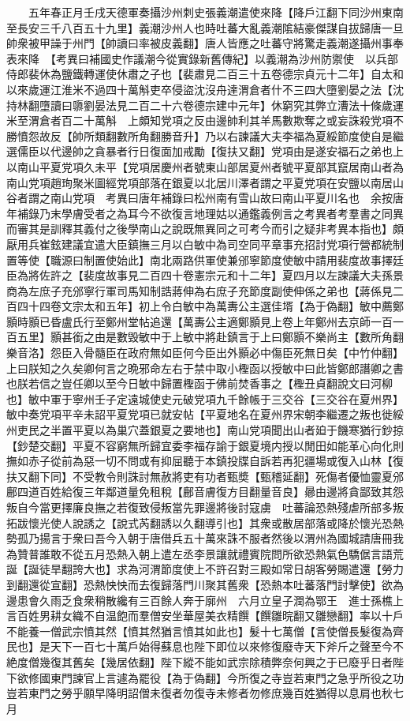　　五年春正月壬戌天德軍奏攝沙州刺史張義潮遣使來降【降戶江翻下同沙州東南至長安三千八百五十九里】義潮沙州人也時吐蕃大亂義潮隂結豪傑謀自拔歸唐一旦帥衆被甲譟于州門【帥讀曰率被皮義翻】唐人皆應之吐蕃守將驚走義潮遂攝州事奉表來降　【考異曰補國史作議潮今從實錄新舊傳紀】以義潮為沙州防禦使　以兵部侍郎裴休為鹽鐵轉運使休肅之子也【裴肅見二百三十五卷德宗貞元十二年】自太和以來歲運江淮米不過四十萬斛吏卒侵盜沈沒舟達渭倉者什不三四大墮劉晏之法【沈持林翻墮讀曰隳劉晏法見二百二十六卷德宗建中元年】休窮究其弊立漕法十條歲運米至渭倉者百二十萬斛　上頗知党項之反由邊帥利其羊馬數欺奪之或妄誅殺党項不勝憤怨故反【帥所類翻數所角翻勝音升】乃以右諫議大夫李福為夏綏節度使自是繼選儒臣以代邊帥之貪暴者行日復面加戒勵【復扶又翻】党項由是遂安福石之弟也上以南山平夏党項久未平【党項居慶州者號東山部居夏州者號平夏部其竄居南山者為南山党項趙珣聚米圖經党項部落在銀夏以北居川澤者謂之平夏党項在安鹽以南居山谷者謂之南山党項　考異曰唐年補錄曰松州南有雪山故曰南山平夏川名也　余按唐年補錄乃末學膚受者之為耳今不欲復言地理姑以通鑑義例言之考異者考羣書之同異而審其是訓釋其義付之後學南山之說既無異同之可考今而引之疑非考異本指也】頗厭用兵崔鉉建議宜遣大臣鎮撫三月以白敏中為司空同平章事充招討党項行營都統制置等使【職源曰制置使始此】南北兩路供軍使兼邠寧節度使敏中請用裴度故事擇廷臣為將佐許之【裴度故事見二百四十卷憲宗元和十二年】夏四月以左諫議大夫孫景商為左庶子充邠寧行軍司馬知制誥蔣伸為右庶子充節度副使伸係之弟也【蔣係見二百四十四卷文宗太和五年】初上令白敏中為萬夀公主選佳壻【為于偽翻】敏中薦鄭顥時顥已昏盧氏行至鄭州堂帖追還【萬夀公主適鄭顥見上卷上年鄭州去京師一百一百五里】顥甚銜之由是數毁敏中于上敏中將赴鎮言于上曰鄭顥不樂尚主【數所角翻樂音洛】怨臣入骨髓臣在政府無如臣何今臣出外顥必中傷臣死無日矣【中竹仲翻】上曰朕知之久矣卿何言之晩邪命左右于禁中取小檉函以授敏中曰此皆鄭郎譖卿之書也朕若信之豈任卿以至今日敏中歸置檉函于佛前焚香事之【檉丑貞翻說文曰河柳也】敏中軍于寧州壬子定遠城使史元破党項九千餘帳于三交谷【三交谷在夏州界】敏中奏党項平辛未詔平夏党項已就安帖【平夏地名在夏州界宋朝李繼遷之叛也徙綏州吏民之半置平夏以為巢穴蓋銀夏之要地也】南山党項聞出山者廹于饑寒猶行鈔掠【鈔楚交翻】平夏不容窮無所歸宜委李福存諭于銀夏境内授以閒田如能革心向化則撫如赤子從前為惡一切不問或有抑屈聽于本鎮投牒自訴若再犯疆場或復入山林【復扶又翻下同】不受教令則誅討無赦將吏有功者甄奬【甄稽延翻】死傷者優恤靈夏邠鄜四道百姓給復三年鄰道量免租稅【鄜音膚復方目翻量音良】曏由邊將貪鄙致其怨叛自今當更擇廉良撫之若復致侵叛當先罪邊將後討寇虜　吐蕃論恐熱殘虐所部多叛拓跋懷光使人說誘之【說式芮翻誘以久翻導引也】其衆或散居部落或降於懷光恐熱勢孤乃揚言于衆曰吾今入朝于唐借兵五十萬來誅不服者然後以渭州為國城請唐冊我為贊普誰敢不從五月恐熱入朝上遣左丞李景讓就禮賓院問所欲恐熱氣色驕倨言語荒誕【誕徒旱翻誇大也】求為河渭節度使上不許召對三殿如常日胡客勞賜遣還【勞力到翻還從宣翻】恐熱怏怏而去復歸落門川聚其舊衆【恐熱本吐蕃落門討擊使】欲為邊患會久雨乏食衆稍散纔有三百餘人奔于廓州　六月立皇子潤為鄂王　進士孫樵上言百姓男耕女織不自温飽而羣僧安坐華屋美衣精饌【饌雛晥翻又雛戀翻】率以十戶不能養一僧武宗憤其然【憤其然猶言憤其如此也】髮十七萬僧【言使僧長髮復為齊民也】是天下一百七十萬戶始得蘇息也陛下即位以來修復廢寺天下斧斤之聲至今不絶度僧幾復其舊矣【幾居依翻】陛下縱不能如武宗除積弊奈何興之于已廢乎日者陛下欲修國東門諫官上言遽為罷役【為于偽翻】今所復之寺豈若東門之急乎所役之功豈若東門之勞乎願早降明詔僧未復者勿復寺未修者勿修庶幾百姓猶得以息肩也秋七月